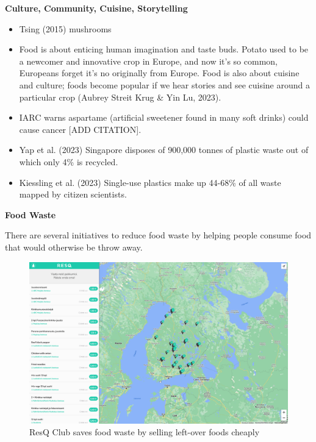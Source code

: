 \documentclass[
  letterpaper,
  DIV=11,
  numbers=noendperiod]{scrartcl}
\providecommand{\tightlist}{%
  \setlength{\itemsep}{0pt}\setlength{\parskip}{0pt}}\usepackage{longtable,booktabs,array}
\begin{document}
\textbf{Culture, Community, Cuisine, Storytelling}

\begin{itemize}
\tightlist
\item
  Tsing (2015) mushrooms
\item
  Food is about enticing human imagination and taste buds. Potato used
  to be a newcomer and innovative crop in Europe, and now it's so
  common, Europeans forget it's no originally from Europe. Food is also
  about cuisine and culture; foods become popular if we hear stories and
  see cuisine around a particular crop (Aubrey Streit Krug \& Yin Lu,
  2023).
\item
  IARC warns aspartame (artificial sweetener found in many soft drinks)
  could cause cancer {[}ADD CITATION{]}.
\item
  Yap et al. (2023) Singapore disposes of 900,000 tonnes of plastic
  waste out of which only 4\% is recycled.
\item
  Kiessling et al. (2023) Single-use plastics make up 44-68\% of all
  waste mapped by citizen scientists.
\end{itemize}

\textbf{Food Waste}

There are several initiatives to reduce food waste by helping people
consume food that would otherwise be throw away.

\begin{figure}[H]

{\centering \includegraphics[width=1\textwidth,height=\textheight]{./images/design/resq-club.png}

}

\caption{ResQ Club saves food waste by selling left-over foods cheaply}

\end{figure}%
\end{document}
